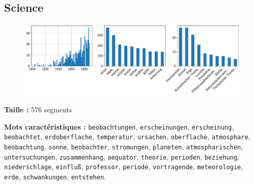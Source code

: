 \documentclass[a4paper,twoside,12pt]{article}
\begin{document}
\clearpage


\subsection*{Science} \label{topic13_science}

\begin{figure}[H]
\centering
\includegraphics[width=\textwidth]{images/topic_charts_13.pdf}
\end{figure}

\begin{flushleft}
\textbf{Taille :} 576 segments

\textbf{Mots caractéristiques :} \texttt{beobachtungen}, \texttt{erscheinungen}, \texttt{erscheinung}, \texttt{beobachtet}, \texttt{erdoberflache}, \texttt{temperatur}, \texttt{ursachen}, \texttt{oberflache}, \texttt{atmosphare}, \texttt{beobachtung}, \texttt{sonne}, \texttt{beobachter}, \texttt{stromungen}, \texttt{planeten}, \texttt{atmospharischen}, \texttt{untersuchungen}, \texttt{zusammenhang}, \texttt{aequator}, \texttt{theorie}, \texttt{perioden}, \texttt{beziehung}, \texttt{niederschlage}, \texttt{einfluß}, \texttt{professor}, \texttt{periode}, \texttt{vortragende}, \texttt{meteorologie}, \texttt{erde}, \texttt{schwankungen}, \texttt{entstehen}.
\end{flushleft}

\medskip
\end{document}
